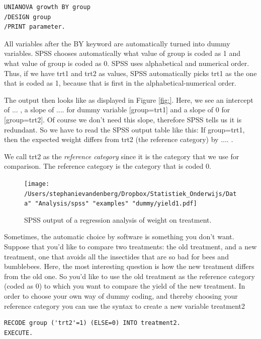 \documentclass[]{report}\usepackage[]{graphicx}\usepackage[]{color}
\begin{document}
\begin{verbatim}
UNIANOVA growth BY group 
/DESIGN group
/PRINT parameter.
\end{verbatim}

All variables after the BY keyword are automatically turned into dummy variables. SPSS chooses automatically what value of group is coded as 1 and what value of group is coded as 0. SPSS uses alphabetical and numerical order. Thus, if we have trt1 and trt2 as values, SPSS automatically picks trt1 as the one that is coded as 1, because that is first in the alphabetical-numerical order. 

The output then looks like as displayed in Figure \ref{fig:}. Here, we see an intercept of ... , a slope of .... for dummy variable [group=trt1] and a slope of 0 for [group=trt2]. Of course we don't need this slope, therefore SPSS tells us it is redundant. So we have to read the SPSS output table like this: If group=trt1, then the expected weight differs from trt2 (the reference category) by .... . 

We call trt2 as the \textit{reference category} since it is the category that we use for comparison. The reference category is the category that is coded 0. 

\begin{figure}[h]
    \begin{center}
       \texttt{[image: /Users/stephanievandenberg/Dropbox/Statistiek\_Onderwijs/Data" "Analysis/spss" "examples" "dummy/yield1.pdf]}
    \end{center}
 \caption{SPSS output of a regression analysis of weight on treatment.}
 \label{fig:dummy_10}
\end{figure}

Sometimes, the automatic choice by software is something you don't want. Suppose that you'd like to compare two treatments: the old treatment, and a new treatment, one that avoids all the insectides that are so bad for bees and bumblebees. Here, the most interesting question is how the new treatment differs from the old one. So you'd like to use the old treatment as the reference category (coded as 0) to which you want to compare the yield of the new treatment.
In order to choose your own way of dummy coding, and thereby choosing your reference category you can use the syntax to create a new variable treatment2

\begin{verbatim}
RECODE group ('trt2'=1) (ELSE=0) INTO treatment2.
EXECUTE.
\end{verbatim}
\end{document}
